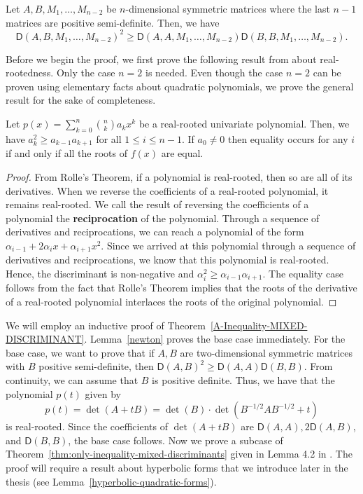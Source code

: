 \documentclass{puthesis-UG}
\begin{document}
\begin{thm} \label{thm:only-inequality-mixed-discriminants}
	Let $A, B, M_1, \ldots, M_{n-2}$ be $n$-dimensional symmetric matrices where the last $n-1$ matrices are positive semi-definite. Then, we have 
	\[
		\mathsf{D}(A, B, M_1, \ldots, M_{n-2})^2 \geq \mathsf{D}(A, A, M_1, \ldots, M_{n-2}) \mathsf{D} (B, B, M_1, \ldots, M_{n-2}).
	\]
\end{thm}

Before we begin the proof, we first prove the following result from \cite{hardy1952inequalities} about real-rootedness. Only the case $n = 2$ is needed. Even though the case $n = 2$ can be proven using elementary facts about quadratic polynomials, we prove the general result for the sake of completeness. 

\begin{lem}  \label{newton}
	Let $p(x) = \sum_{k = 0}^n \binom{n}{k} a_k x^k$ be a real-rooted univariate polynomial. Then, we have $a_k^2 \geq a_{k-1}a_{k+1}$ for all $1 \leq i \leq n-1$. If $a_0 \neq 0$ then equality occurs for any $i$ if and only if all the roots of $f(x)$ are equal. 
\end{lem}

\begin{proof}
	From Rolle's Theorem, if a polynomial is real-rooted, then so are all of its derivatives. When we reverse the coefficients of a real-rooted polynomial, it remains real-rooted. We call the result of reversing the coefficients of a polynomial the \textbf{reciprocation} of the polynomial. Through a sequence of derivatives and reciprocations, we can reach a polynomial of the form $\alpha_{i-1} + 2\alpha_i x + \alpha_{i+1} x^2$. Since we arrived at this polynomial through a sequence of derivatives and reciprocations, we know that this polynomial is real-rooted. Hence, the discriminant is non-negative and $\alpha_i^2 \geq \alpha_{i-1} \alpha_{i+1}$. The equality case follows from the fact that Rolle's Theorem implies that the roots of the derivative of a real-rooted polynomial interlaces the roots of the original polynomial. 
\end{proof}

We will employ an inductive proof of Theorem~\ref{A-Inequality-MIXED-DISCRIMINANT}. Lemma~\ref{newton} proves the base case immediately. For the base case, we want to prove that if $A, B$ are two-dimensional symmetric matrices with $B$ positive semi-definite, then $\mathsf{D}(A, B)^2 \geq \mathsf{D}(A, A) \mathsf{D}(B, B)$. From continuity, we can assume that $B$ is positive definite. Thus, we have that the polynomial $p(t)$ given by 
\[
	p(t) = \det (A + tB) = \det (B) \cdot \det (B^{-1/2} A B^{-1/2} + t)
\] 
is real-rooted. Since the coefficients of $\det (A + tB)$ are $\mathsf{D}(A, A), 2 \mathsf{D}(A, B)$, and $\mathsf{D}(B, B)$, the base case follows. Now we prove a subcase of Theorem~\ref{thm:only-inequality-mixed-discriminants} given in Lemma 4.2 in \cite{bochner}. The proof will require a result about hyperbolic forms that we introduce later in the thesis (see Lemma~\ref{hyperbolic-quadratic-forms}).
\end{document}
